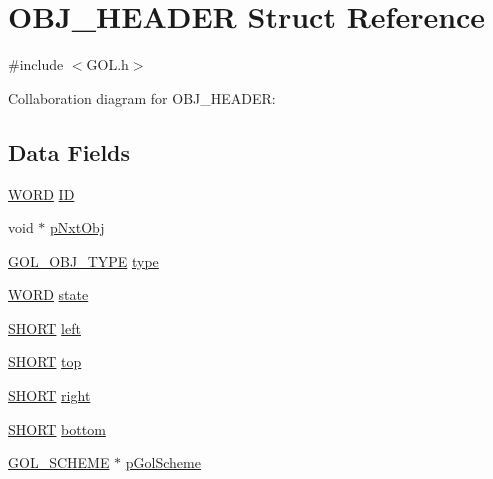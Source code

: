 \hypertarget{struct_o_b_j___h_e_a_d_e_r}{}\section{O\+B\+J\+\_\+\+H\+E\+A\+D\+E\+R Struct Reference}
\label{struct_o_b_j___h_e_a_d_e_r}


{\ttfamily \#include $<$G\+O\+L.\+h$>$}



Collaboration diagram for O\+B\+J\+\_\+\+H\+E\+A\+D\+E\+R\+:
\subsection*{Data Fields}
\begin{DoxyCompactItemize}
\item 
\hyperlink{_generic_type_defs_8h_a2b0e863dadf920709ec53d9088ee7c91}{W\+O\+R\+D} \hyperlink{struct_o_b_j___h_e_a_d_e_r_a79cf9bf3b48476101422d9b453e0945a}{I\+D}
\item 
void $\ast$ \hyperlink{struct_o_b_j___h_e_a_d_e_r_ab7ddc84a3164ca90e6e6392d0c6f8535}{p\+Nxt\+Obj}
\item 
\hyperlink{_g_o_l_8h_a3494c9548cd1faee96238bca5d1373e8}{G\+O\+L\+\_\+\+O\+B\+J\+\_\+\+T\+Y\+P\+E} \hyperlink{struct_o_b_j___h_e_a_d_e_r_a0c6d83fa135e978036a424ac749b32d9}{type}
\item 
\hyperlink{_generic_type_defs_8h_a2b0e863dadf920709ec53d9088ee7c91}{W\+O\+R\+D} \hyperlink{struct_o_b_j___h_e_a_d_e_r_a5d717a64978f34c9afb8ae23374160a0}{state}
\item 
\hyperlink{_generic_type_defs_8h_ae9bb25d3afecf3bfab0fbe3c22c2050f}{S\+H\+O\+R\+T} \hyperlink{struct_o_b_j___h_e_a_d_e_r_a24b9199fd8600849a2a3f9933474789d}{left}
\item 
\hyperlink{_generic_type_defs_8h_ae9bb25d3afecf3bfab0fbe3c22c2050f}{S\+H\+O\+R\+T} \hyperlink{struct_o_b_j___h_e_a_d_e_r_ae53b6204fda5d3270bd1a3aba7a88eab}{top}
\item 
\hyperlink{_generic_type_defs_8h_ae9bb25d3afecf3bfab0fbe3c22c2050f}{S\+H\+O\+R\+T} \hyperlink{struct_o_b_j___h_e_a_d_e_r_aa414475e19c55ba5db1b1f485f5e3785}{right}
\item 
\hyperlink{_generic_type_defs_8h_ae9bb25d3afecf3bfab0fbe3c22c2050f}{S\+H\+O\+R\+T} \hyperlink{struct_o_b_j___h_e_a_d_e_r_a85afe4f0d49adc47a2c4e5e7bf20f219}{bottom}
\item 
\hyperlink{struct_g_o_l___s_c_h_e_m_e}{G\+O\+L\+\_\+\+S\+C\+H\+E\+M\+E} $\ast$ \hyperlink{struct_o_b_j___h_e_a_d_e_r_a1897e3352f07d9935b29e8bd5a98450c}{p\+Gol\+Scheme}

\end{DoxyCompactItemize}
